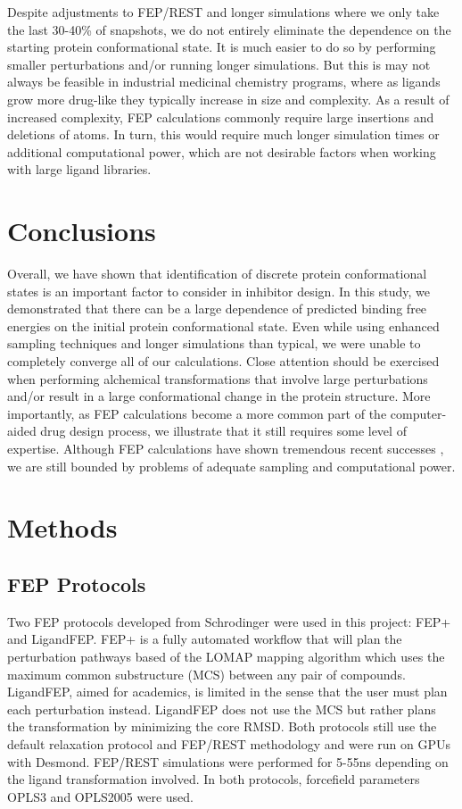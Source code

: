 \documentclass[journal=jctcce,manuscript=article]{achemso}
\begin{document}
Despite adjustments to FEP/REST and longer simulations where we only take the last 30-40\% of snapshots, we do not entirely eliminate the dependence on the starting protein conformational state.
It is much easier to do so by performing smaller perturbations and/or running longer simulations.
But this is may not always be feasible in industrial medicinal chemistry programs, where as ligands grow more drug-like they typically increase in size and complexity.
As a result of increased complexity, FEP calculations commonly require large insertions and deletions of atoms.
In turn, this would require much longer simulation times or additional computational power, which are not desirable factors when working with large ligand libraries.

\section{Conclusions}
Overall, we have shown that identification of discrete protein conformational states is an important factor to consider in inhibitor design.
In this study, we demonstrated that there can be a large dependence of predicted binding free energies on the initial protein conformational state.
Even while using enhanced sampling techniques and longer simulations than typical, we were unable to completely converge all of our calculations.
Close attention should be exercised when performing alchemical transformations that involve large perturbations and/or result in a large conformational change in the protein structure.
More importantly, as FEP calculations become a more common part of the computer-aided drug design process, we illustrate that it still requires some level of expertise.
Although FEP calculations have shown tremendous recent successes \cite{FEPplus}, we are still bounded by problems of adequate sampling and computational power.

\section{Methods}
\subsection{FEP Protocols}
Two FEP protocols developed from Schrodinger were used in this project: FEP+ and LigandFEP.
FEP+ is a fully automated workflow that will plan the perturbation pathways based of the LOMAP mapping algorithm which uses the maximum common substructure (MCS) between any pair of compounds.
LigandFEP, aimed for academics, is limited in the sense that the user must plan each perturbation instead.
LigandFEP does not use the MCS but rather plans the transformation by minimizing the core RMSD.
Both protocols still use the default relaxation protocol and FEP/REST methodology and were run on GPUs with Desmond.
FEP/REST simulations were performed for 5-55ns depending on the ligand transformation involved.
In both protocols, forcefield parameters OPLS3 and OPLS2005 were used.\\
\end{document}
